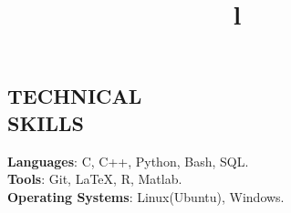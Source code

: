 \documentclass[margin]{res}
\begin{document}
\begin{resume}

\section{TECHNICAL\\SKILLS}
\textbf{Languages}: C, C++, Python,  Bash, SQL.
\\
\textbf{Tools}:  Git, \LaTeX,  R, Matlab.
\\
\textbf{Operating Systems}:  Linux(Ubuntu), Windows.

\begin{format}
\title{l}\\
\\
\body\\
\end{format}


\end{resume}
\end{document}
